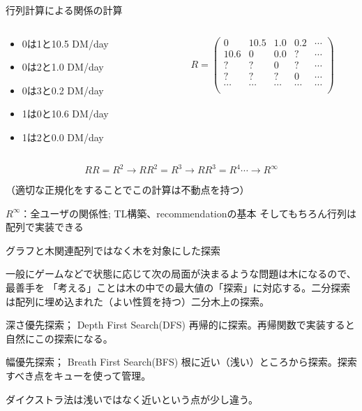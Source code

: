 \documentclass{beamer}
\begin{document}
\begin{frame}[fragile]{行列計算による関係の計算}{}
\begin{columns}
\begin{column}{0.5\textwidth}
\begin{itemize}%
\item 0は1と10.5 DM/day
\item 0は2と1.0 DM/day
\item 0は3と0.2 DM/day
\item 1は0と10.6 DM/day
\item 1は2と0.0 DM/day
\end{itemize}
\end{column}
\begin{column}{0.5\textwidth}
\[
R = 
\begin{pmatrix}
0 & 10.5 & 1.0 & 0.2 & \cdots \\
10.6 & 0 & 0.0 & ? & \cdots\\
? & ? & 0 & ? & \cdots\\
? & ? & ? & 0 & \cdots \\
\cdots & \cdots & \cdots & \cdots & \cdots\\
\end{pmatrix}
\]
\end{column}
\end{columns}

\vfill
\[
RR = R^{2} \to RR^{2} = R^{3} \to RR^{3} = R^{4} \cdots \longrightarrow R^{\infty}
\]

（適切な正規化をすることでこの計算は不動点を持つ）

\vfill
$R^{\infty}$：全ユーザの関係性; TL構築、recommendationの基本
\vfill
そしてもちろん行列は配列で実装できる
\end{frame}

\begin{frame}[fragile]{グラフと木関連}{配列ではなく木を対象にした探索}

一般にゲームなどで状態に応じて次の局面が決まるような問題は木になるので、最善手を
「考える」ことは木の中での最大値の「探索」に対応する。二分探索は配列に埋め込まれた（よい性質を持つ）二分木上の探索。

\begin{exampleblock}{深さ優先探索； Depth First Search(DFS)}
再帰的に探索。再帰関数で実装すると自然にこの探索になる。
\end{exampleblock}

\begin{exampleblock}{幅優先探索； Breath First Search(BFS)}
根に近い（浅い）ところから探索。探索すべき点をキューを使って管理。
\end{exampleblock}
ダイクストラ法は浅いではなく近いという点が少し違う。
\end{frame}
\end{document}
